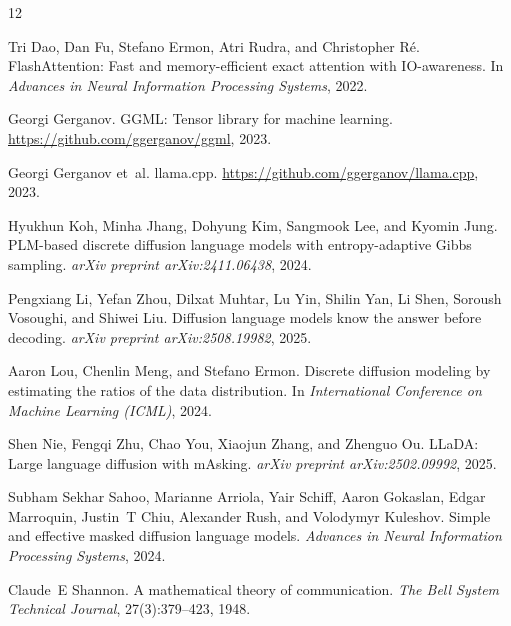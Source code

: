 \documentclass[11pt]{article}
\begin{document}


\begin{thebibliography}{12}

Tri Dao, Dan Fu, Stefano Ermon, Atri Rudra, and Christopher R\'e.
\newblock FlashAttention: Fast and memory-efficient exact attention with
  IO-awareness.
\newblock In \emph{Advances in Neural Information Processing Systems}, 2022.

Georgi Gerganov.
\newblock GGML: Tensor library for machine learning.
\newblock \url{https://github.com/ggerganov/ggml}, 2023.

Georgi Gerganov et~al.
\newblock llama.cpp.
\newblock \url{https://github.com/ggerganov/llama.cpp}, 2023.

Hyukhun Koh, Minha Jhang, Dohyung Kim, Sangmook Lee, and Kyomin Jung.
\newblock PLM-based discrete diffusion language models with entropy-adaptive
  Gibbs sampling.
\newblock \emph{arXiv preprint arXiv:2411.06438}, 2024.

Pengxiang Li, Yefan Zhou, Dilxat Muhtar, Lu Yin, Shilin Yan, Li Shen, Soroush
  Vosoughi, and Shiwei Liu.
\newblock Diffusion language models know the answer before decoding.
\newblock \emph{arXiv preprint arXiv:2508.19982}, 2025.

Aaron Lou, Chenlin Meng, and Stefano Ermon.
\newblock Discrete diffusion modeling by estimating the ratios of the data
  distribution.
\newblock In \emph{International Conference on Machine Learning (ICML)}, 2024.

Shen Nie, Fengqi Zhu, Chao You, Xiaojun Zhang, and Zhenguo Ou.
\newblock LLaDA: Large language diffusion with mAsking.
\newblock \emph{arXiv preprint arXiv:2502.09992}, 2025.

Subham Sekhar Sahoo, Marianne Arriola, Yair Schiff, Aaron Gokaslan, Edgar
  Marroquin, Justin~T Chiu, Alexander Rush, and Volodymyr Kuleshov.
\newblock Simple and effective masked diffusion language models.
\newblock \emph{Advances in Neural Information Processing Systems}, 2024.

Claude~E Shannon.
\newblock A mathematical theory of communication.
\newblock \emph{The Bell System Technical Journal}, 27(3):379--423, 1948.


\end{thebibliography}
\end{document}
